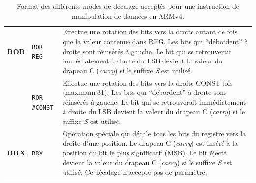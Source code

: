 \documentclass{tufte-handout}
\begin{document}
\begin{table}
\begin{tabular}{l|l|p{13.5cm}}
 \textbf{ROR} & \texttt{ROR REG} & Effectue une rotation des bits vers la droite autant de fois que la valeur contenue dans REG. Les bits qui ``débordent'' à droite sont réinsérés à gauche. Le bit qui se retrouverait immédiatement à droite du LSB devient la valeur du drapeau C (\textit{carry}) si le suffixe \textit{S} est utilisé. \\
   & \texttt{ROR \#CONST} & Effectue une rotation des bits vers la droite CONST fois (maximum 31). Les bits qui ``débordent'' à droite sont réinsérés à gauche. Le bit qui se retrouverait immédiatement à droite du LSB devient la valeur du drapeau C (\textit{carry}) si le suffixe \textit{S} est utilisé. \\ \hline
  
 \textbf{RRX} & \texttt{RRX} & Opération spéciale qui décale tous les bits du registre vers la droite d'une position. Le drapeau C (\textit{carry}) est inséré à la position du bit le plus significatif (MSB). Le bit éjecté devient la valeur du drapeau C (\textit{carry}) si le suffixe \textit{S} est utilisé. Ce décalage n'accepte pas de paramètre. \\
\end{tabular}
\label{t:decalage}
\caption{Format des différents modes de décalage acceptés pour une instruction de manipulation de données en ARMv4.}
\end{table}
\end{document}
